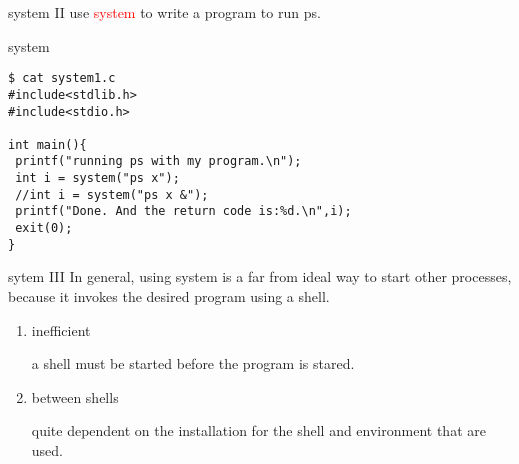 \documentclass{beamer}
\begin{document}
\begin{frame}[fragile]{system II}
use \textcolor{red}{system} to write a program to run ps.
\begin{block}{system}
\begin{verbatim}
$ cat system1.c
#include<stdlib.h>
#include<stdio.h>

int main(){
 printf("running ps with my program.\n");
 int i = system("ps x");
 //int i = system("ps x &");
 printf("Done. And the return code is:%d.\n",i);
 exit(0);
}
\end{verbatim}
\end{block}

\end{frame}
\begin{frame}{sytem III}
In general, using system is a far from ideal way to start other processes, because it invokes the desired program using a shell. 
\begin{enumerate}
\item
inefficient

a shell must be started before the program is stared.
\item
between shells

quite dependent on the installation for the shell and environment that are used.
\end{enumerate}\end{frame}
\end{document}
